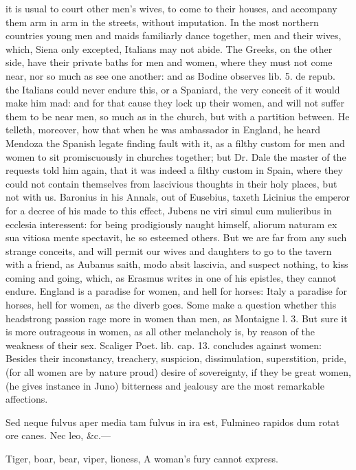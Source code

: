 {it is usual to court other men's wives, to come to their houses, and
accompany them arm in arm in the streets, without imputation. In the
most northern countries young men and maids familiarly dance together,
men and their wives, which, Siena only excepted, Italians may not
abide. The Greeks, on the other side, have their private baths
for men and women, where they must not come near, nor so much as see
one another: and as Bodine observes lib. 5. de repub. the
Italians could never endure this, or a Spaniard, the very conceit of it
would make him mad: and for that cause they lock up their women, and
will not suffer them to be near men, so much as in the church,
but with a partition between. He telleth, moreover, how that when he
was ambassador in England, he heard Mendoza the Spanish legate finding
fault with it, as a filthy custom for men and women to sit
promiscuously in churches together; but Dr. Dale the master of the
requests told him again, that it was indeed a filthy custom in Spain,
where they could not contain themselves from lascivious thoughts in
their holy places, but not with us. Baronius in his Annals, out of
Eusebius, taxeth Licinius the emperor for a decree of his made to this
effect, Jubens ne viri simul cum mulieribus in ecclesia interessent:
for being prodigiously naught himself, aliorum naturam ex sua vitiosa
mente spectavit, he so esteemed others. But we are far from any such
strange conceits, and will permit our wives and daughters to go to the
tavern with a friend, as Aubanus saith, modo absit lascivia, and
suspect nothing, to kiss coming and going, which, as Erasmus writes in
one of his epistles, they cannot endure. England is a paradise for
women, and hell for horses: Italy a paradise for horses, hell for
women, as the diverb goes. Some make a question whether this headstrong
passion rage more in women than men, as Montaigne l. 3. But sure it is
more outrageous in women, as all other melancholy is, by reason of the
weakness of their sex. Scaliger Poet. lib. cap. 13. concludes against
women: Besides their inconstancy, treachery, suspicion,
dissimulation, superstition, pride, (for all women are by nature proud)
desire of sovereignty, if they be great women, (he gives instance in
Juno) bitterness and jealousy are the most remarkable affections.

Sed neque fulvus aper media tam fulvus in ira est,
Fulmineo rapidos dum rotat ore canes.
Nec leo, \&c.---

Tiger, boar, bear, viper, lioness,
A woman's fury cannot express.

}
